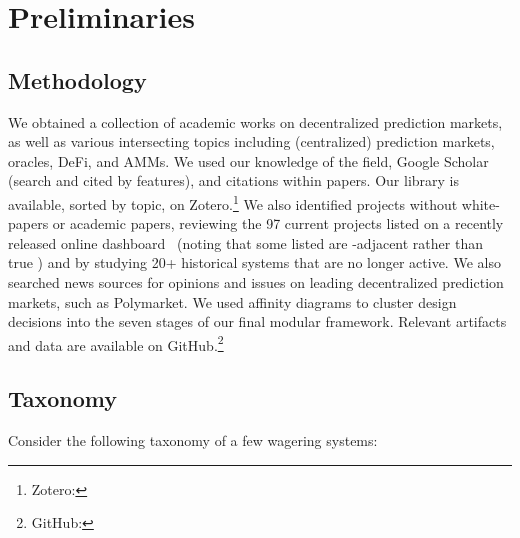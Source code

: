 \section{Preliminaries}

\subsection{Methodology}

We obtained a collection of academic works on decentralized prediction markets, as well as various intersecting topics including (centralized) prediction markets, oracles, DeFi, and AMMs. We used our knowledge of the field, Google Scholar (search and cited by features), and citations within papers. Our library is available, sorted by topic, on Zotero.\footnote{Zotero: } We also identified projects without white-papers or academic papers, reviewing the 97 current projects listed on a recently released online dashboard~\cite{Sal25} (noting that some listed are \depm-adjacent rather than true \depms) and by studying 20+ historical systems that are no longer active. We also searched news sources for opinions and issues on leading decentralized prediction markets, such as Polymarket. We used affinity diagrams to cluster design decisions into the seven stages of our final modular framework. Relevant artifacts and data are available on GitHub.\footnote{GitHub: }   


\subsection{Taxonomy}

Consider the following taxonomy of a few wagering systems:


